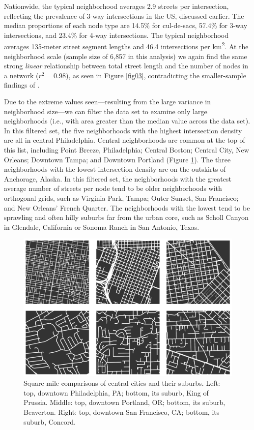 \documentclass{article}
\begin{document}
Nationwide, the typical neighborhood averages 2.9 streets per intersection, reflecting the prevalence of 3-way intersections in the US, discussed earlier. The median proportions of each node type are 14.5\% for cul-de-sacs, 57.4\% for 3-way intersections, and 23.4\% for 4-way intersections. The typical neighborhood averages 135-meter street segment lengths and 46.4 intersections per km\textsuperscript{2}. At the neighborhood scale (sample size of 6,857 in this analysis) we again find the same strong \emph{linear} relationship between total street length and the number of nodes in a network ($r^{2}=0.98$), as seen in Figure \ref{fig03}, contradicting the smaller-sample findings of \citet{strano_urban_2013}.

Due to the extreme values seen---resulting from the large variance in neighborhood size---we can filter the data set to examine only large neighborhoods (i.e., with area greater than the median value across the data set). In this filtered set, the five neighborhoods with the highest intersection density are all in central Philadelphia. Central neighborhoods are common at the top of this list, including Point Breeze, Philadelphia; Central Boston; Central City, New Orleans; Downtown Tampa; and Downtown Portland (Figure \ref{fig05}). The three neighborhoods with the lowest intersection density are on the outskirts of Anchorage, Alaska. In this filtered set, the neighborhoods with the greatest average number of streets per node tend to be older neighborhoods with orthogonal grids, such as Virginia Park, Tampa; Outer Sunset, San Francisco; and New Orleans' French Quarter. The neighborhoods with the lowest tend to be sprawling and often hilly suburbs far from the urban core, such as Scholl Canyon in Glendale, California or Sonoma Ranch in San Antonio, Texas.

\begin{figure}
	\includegraphics[width=1\textwidth]{media/fig05.png}
	\caption{Square-mile comparisons of central cities and their suburbs. Left: top, downtown Philadelphia, PA; bottom, its suburb, King of Prussia. Middle: top, downtown Portland, OR; bottom, its suburb, Beaverton. Right: top, downtown San Francisco, CA; bottom, its suburb, Concord.}
	\label{fig05}
\end{figure}
\end{document}
